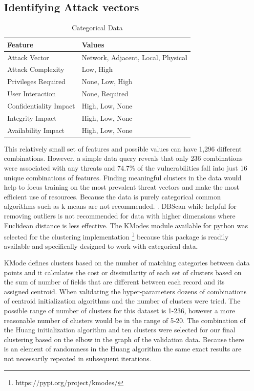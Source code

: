 \documentclass{article} %
\begin{document}
\subsection{Identifying Attack vectors}
\begin{table}[h!]
\begin{center}
\begin{tabular}{ |l|l| } \hline
Feature & Values\\\hline
Attack Vector & Network, Adjacent, Local, Physical  \\ 
Attack Complexity & Low, High  \\ 
Privileges Required & None, Low, High  \\ 
User Interaction & None, Required  \\ 
Confidentiality Impact & High, Low, None\\
Integrity Impact & High, Low, None\\
Availability Impact & High, Low, None\\
\hline
\end{tabular}
\end{center}
\caption{Categorical Data} 
\label{table:categoricalData}
\end{table} 

This relatively small set of features and possible values can have 1,296 different combinations.  However, a simple data query reveals that only 236 combinations were associated with any threats and 74.7\% of the vulnerabilities fall into just 16 unique combinations of features.  Finding meaningful clusters in the data would help to focus training on the most prevalent threat vectors and make the most efficient use of resources. Because the data is purely categorical common algorithms such as k-means are not recommended. \cite{Tan2019IntroductionMining}.  DBScan while helpful for removing outliers is not recommended for data with higher dimensions where Euclidean distance is less effective.  The KModes module available for python was selected for the clustering implementation \footnote{https://pypi.org/project/kmodes/}  because this package is readily available and specifically designed to work with categorical data.


KMode defines clusters based on the number of matching categories between data points and it calculates the cost or dissimilarity of each set of clusters based on the sum of number of fields that are different between each record and its assigned centroid.  When validating the hyper-parameters dozens of combinations of centroid initialization algorithms and the number of clusters were tried.  The possible range of number of clusters for this dataset is 1-236, however a more reasonable number of clusters would be in the range of 5-20.  The combination of the Huang initialization algorithm and ten clusters were selected for our final clustering based on the elbow in the graph of the validation data.  Because there is an element of randomness in the Huang algorithm the same exact results are not necessarily repeated in subsequent iterations.
\end{document}
